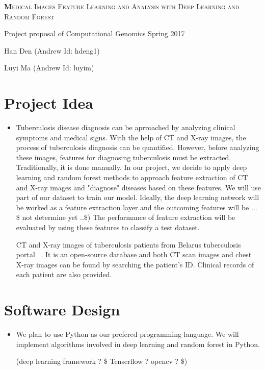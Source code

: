 \documentclass[letterpaper, 12pt]{article}
\begin{document}
\begin{center}
{\Large
	\textsc{\textbf Medical Images Feature Learning and Analysis with Deep Learning and Random Forest}
}

\vspace{0.3cm}

\normalsize Project proposal of Computational Genomics Spring 2017

\vspace{0.5cm}

{\small
	Han Den (Andrew Id: hdeng1)
	
	Luyi Ma (Andrew Id: luyim)
}
\end{center}

\section{Project Idea}

\begin{itemize}
\item
Tuberculosis disease diagnosis can be aprroached by analyzing clinical symptoms and medical signs. With the help of CT and X-ray images, the process of tuberculosis diagnosis can be quantified. However, before analyzing these images, features for diagnosing tuberculosis must be extracted. Traditionally, it is done manually. In our project, we decide to apply deep learning and random forest methods to approach feature extraction of CT and X-ray images and "diagnose" diseases based on these features. We will use part of our dataset to train our model. 
\color{red} Ideally, the deep learning network will be worked as a feature extraction layer and the outcoming features will be ... \$ not determine yet ..\$)
\color{black} The performance of feature extraction will be evaluated by using these features to classify a test dataset. 

CT and X-ray images of tuberculosis patients from Belarus tuberculosis portal
~\cite{TB_database}.
It is an open-source database and both CT scan images and chest X-ray images can be found by searching the patient's ID. Clinical records of each patient are also provided.
\end{itemize}

\section{Software Design}
\begin{itemize}
\item
We plan to use Python as our prefered programming language. We will implement algorithms involved in deep learning and random forest in Python.

\color{red} (deep learning framework ? \$ Tenserflow ? opencv ? \$)

\end{itemize}
\end{document}
